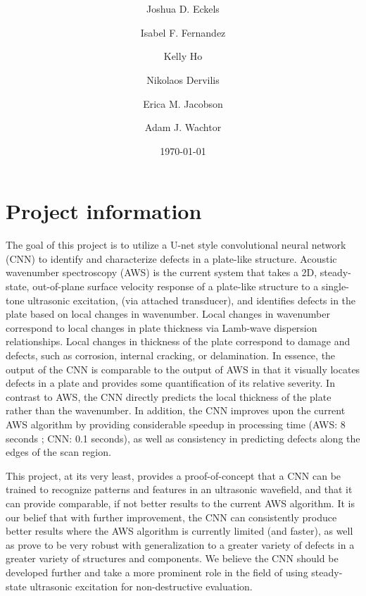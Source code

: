 \documentclass[11pt,letterpaper]{article}
\title{\Large{\textbf{\myTitle}}}
\author[1]{\large{Joshua D. Eckels}}
\author[1]{\large{Isabel F. Fernandez}}
\author[1]{\large{Kelly Ho}}
\author[2]{\authorcr\large{Nikolaos Dervilis}}
\author[1]{\large{Erica M. Jacobson}}
\author[1]{\large{Adam J. Wachtor}}
\affil[1]{NSEC-EI, Los Alamos National Laboratory, \authorcr Los Alamos, NM 87545 \bigskip}
\affil[2]{Department of Mechanical Engineering, The University of Sheffield, \authorcr Sheffield, UK S10 2TN}
\date{\today}
\begin{document}
	\maketitle
    \singlespacing
    \setlength{\parindent}{0in}
    
	\section{Project information}
	The goal of this project is to utilize a U-net style convolutional neural network (CNN) to identify and characterize defects in a plate-like structure. Acoustic wavenumber spectroscopy (AWS) is the current system that takes a 2D, steady-state, out-of-plane surface velocity response of a plate-like structure to a single-tone ultrasonic excitation, (via attached transducer), and identifies defects in the plate based on local changes in wavenumber. Local changes in wavenumber correspond to local changes in plate thickness via Lamb-wave dispersion relationships. Local changes in thickness of the plate correspond to damage and defects, such as corrosion, internal cracking, or delamination. In essence, the output of the CNN is comparable to the output of AWS in that it visually locates defects in a plate and provides some quantification of its relative severity. In contrast to AWS, the CNN directly predicts the local thickness of the plate rather than the wavenumber. In addition, the CNN improves upon the current AWS algorithm by providing considerable speedup in processing time (AWS: 8 seconds ; CNN: 0.1 seconds), as well as consistency in predicting defects along the edges of the scan region. \bigskip
	
	This project, at its very least, provides a proof-of-concept that a CNN can be trained to recognize patterns and features in an ultrasonic wavefield, and that it can provide comparable, if not better results to the current AWS algorithm. It is our belief that with further improvement, the CNN can consistently produce better results where the AWS algorithm is currently limited (and faster), as well as prove to be very robust with generalization to a greater variety of defects in a greater variety of structures and components. We believe the CNN should be developed further and take a more prominent role in the field of using steady-state ultrasonic excitation for non-destructive evaluation. \bigskip
	
\end{document}
